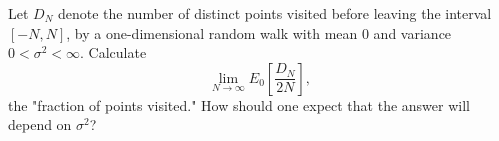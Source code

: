 Let \(D_N\) denote the number of distinct points visited before leaving the interval \([-N,N]\), by a one-dimensional random walk with mean 0 and variance \(0 < \sigma^2 < \infty\). Calculate
\[
\lim_{N \to \infty} E_0\left[\frac{D_N}{2N}\right],
\]
the "fraction of points visited." How should one expect that the answer will depend on \(\sigma^2\)?
